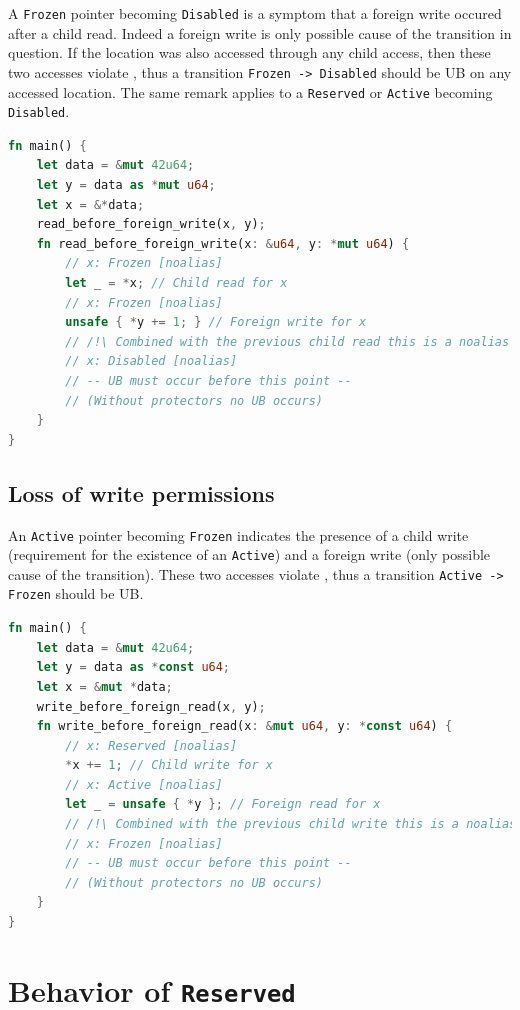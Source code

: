 \documentclass[a4paper,11pt]{article}
\theoremstyle{plain}
\theoremstyle{definition}
\theoremstyle{remark}
\newcommand{\tcode}[1]{\rstinline{#1}}
\newcommand{\tperm}[1]{\texttt{#1}}
\begin{document}
A \tperm{Frozen} pointer becoming \tperm{Disabled} is a symptom that a foreign write occured after
a child read. Indeed a foreign write is only possible cause of the transition in question.
If the location was also accessed through any child access, then these two accesses violate
\tcode{noalias}, thus a transition \tperm{Frozen -> Disabled} should be UB on any accessed location.
The same remark applies to a \tperm{Reserved} or \tperm{Active} becoming \tperm{Disabled}.

\begin{lstlisting}[language=rust]
fn main() {
    let data = &mut 42u64;
    let y = data as *mut u64;
    let x = &*data;
    read_before_foreign_write(x, y);
    fn read_before_foreign_write(x: &u64, y: *mut u64) {
        // x: Frozen [noalias]
        let _ = *x; // Child read for x
        // x: Frozen [noalias]
        unsafe { *y += 1; } // Foreign write for x
        // /!\ Combined with the previous child read this is a noalias violation
        // x: Disabled [noalias]
        // -- UB must occur before this point --
        // (Without protectors no UB occurs)
    }
}
\end{lstlisting}


\subsection{Loss of write permissions}

An \tperm{Active} pointer becoming \tperm{Frozen} indicates the presence of a child write
(requirement for the existence of an \tperm{Active}) and a foreign write (only possible cause
of the transition). These two accesses violate \tcode{noalias}, thus a transition \tperm{Active -> Frozen}
should be UB.

\begin{lstlisting}[language=rust]
fn main() {
    let data = &mut 42u64;
    let y = data as *const u64;
    let x = &mut *data;
    write_before_foreign_read(x, y);
    fn write_before_foreign_read(x: &mut u64, y: *const u64) {
        // x: Reserved [noalias]
        *x += 1; // Child write for x
        // x: Active [noalias]
        let _ = unsafe { *y }; // Foreign read for x
        // /!\ Combined with the previous child write this is a noalias violation
        // x: Frozen [noalias]
        // -- UB must occur before this point --
        // (Without protectors no UB occurs)
    }
}
\end{lstlisting}

\newpage
\section{Behavior of \tperm{Reserved}}
\label{app:reserved}
\end{document}
